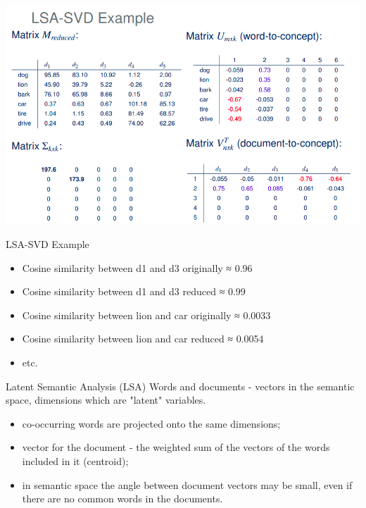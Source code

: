 \documentclass[svgnames]{beamer}
\begin{document}
    \begin{frame}
        \includegraphics[width=.9\textwidth]{lsa-svd2}
    \end{frame}

    \begin{frame}{LSA-SVD Example}
        \begin{itemize}
            \item Cosine similarity between d1 and d3 originally ≈ 0.96
            \item Cosine similarity between d1 and d3 reduced ≈ 0.99
            \item Cosine similarity between lion and car originally ≈ 0.0033
            \item Cosine similarity between lion and car reduced ≈ 0.0054
            \item etc.
        \end{itemize}
    \end{frame}

    \begin{frame}{Latent Semantic Analysis (LSA)}
        Words and documents - vectors in the semantic space, dimensions
        which are "latent" variables.
        \begin{itemize}
            \item co-occurring words are projected onto the same dimensions;
            \item vector for the document - the weighted sum of the vectors of the words included in it (centroid);
            \item in semantic space the angle between document vectors
            may be small, \alert{even if there are no common words in the documents}.
        \end{itemize}
    \end{frame}
\end{document}
